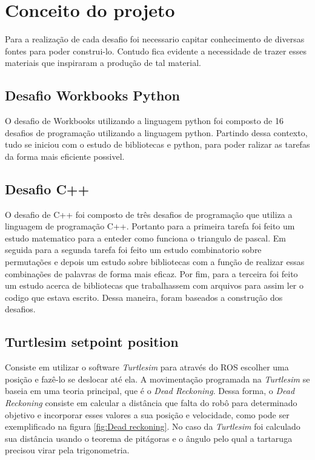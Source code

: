 \chapter{Conceito do projeto}
\label{chap:fundteor}

Para a realização de cada desafio foi necessario capitar conhecimento de diversas fontes para poder construi-lo. Contudo fica evidente a necessidade de trazer esses materiais que inspiraram a produção de tal material.

\section{Desafio Workbooks Python}

O desafio de Workbooks utilizando a linguagem python foi composto de 16 desafios de programação utilizando a linguagem python. Partindo dessa contexto, tudo se iniciou com o estudo de bibliotecas e python, para poder ralizar as tarefas da forma mais eficiente possivel.

\section{Desafio C++}
O desafio de C++ foi composto de três desafios de programação que utiliza a linguagem de programação C++. Portanto para a primeira tarefa foi feito um estudo matematico para a enteder como funciona o triangulo de pascal. Em seguida para a segunda tarefa foi feito um estudo combinatorio sobre permutações e depois um estudo sobre bibliotecas  com a função de realizar essas combinações de palavras de forma mais eficaz. Por fim, para a terceira foi feito um estudo acerca de bibliotecas que trabalhassem com arquivos para assim ler o codigo que estava escrito. Dessa maneira, foram baseados a construção dos desafios.

\section{Turtlesim setpoint position}
Consiste em utilizar o software \textit{Turtlesim} para através do ROS escolher uma posição e fazê-lo se deslocar até ela. A movimentação programada na \textit{Turtlesim} se baseia em uma teoria principal, que é o \textit{Dead Reckoning}. Dessa forma, o \textit{Dead Reckoning} consiste em calcular a distância que falta do robô para determinado objetivo e incorporar esses valores a sua posição e velocidade, como pode ser exemplificado na figura \ref{fig:Dead reckoning}. No caso da \textit{Turtlesim} foi calculado sua distância usando o teorema de pitágoras e o ângulo pelo qual a tartaruga precisou virar pela trigonometria.

